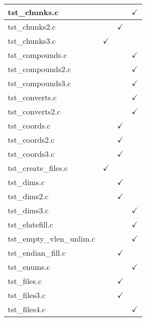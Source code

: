 \begin{table}[H]
\begin{tabular}{|l|c|c|c|}
tst\_chunks.c           &               &               & $\checkmark$  \\ \hline
tst\_chunks2.c          &               & $\checkmark$  &               \\ \hline
tst\_chunks3.c          & $\checkmark$  &               &               \\ \hline
tst\_compounds.c        &               &               & $\checkmark$  \\ \hline
tst\_compounds2.c       &               &               & $\checkmark$  \\ \hline
tst\_compounds3.c       &               &               & $\checkmark$  \\ \hline
tst\_converts.c         &               &               & $\checkmark$  \\ \hline
tst\_converts2.c        &               &               & $\checkmark$  \\ \hline
tst\_coords.c           &               & $\checkmark$  &               \\ \hline
tst\_coords2.c          &               & $\checkmark$  &               \\ \hline
tst\_coords3.c          &               & $\checkmark$  &               \\ \hline
tst\_create\_files.c    & $\checkmark$  &               &               \\ \hline
tst\_dims.c             &               & $\checkmark$  &               \\ \hline
tst\_dims2.c            &               & $\checkmark$  &               \\ \hline
tst\_dims3.c            &               &               & $\checkmark$  \\ \hline
tst\_elatefill.c        &               &               & $\checkmark$  \\ \hline
tst\_empty\_vlen\_unlim.c   &           &               & $\checkmark$  \\ \hline
tst\_endian\_fill.c     &               & $\checkmark$  &               \\ \hline
tst\_enums.c            &               &               & $\checkmark$  \\ \hline
tst\_files.c            &               & $\checkmark$  &               \\ \hline
tst\_files3.c           &               & $\checkmark$  &               \\ \hline
tst\_files4.c           &               &               & $\checkmark$  \\ \hline

\end{tabular}
\end{table}
